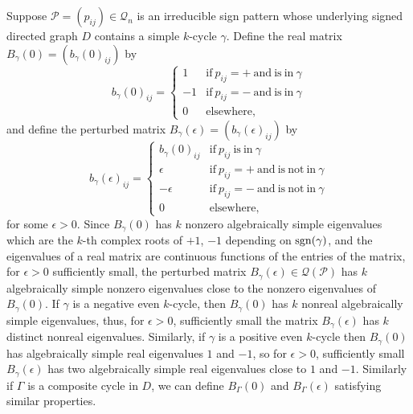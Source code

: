 \documentclass[a4paper, 10pt]{article}
\numberwithin{equation}{section}
\def\sgn{{\rm sgn}}
\begin{document}
	Suppose $\mathcal{P}=(p_{ij})\in \mathcal{Q}_n$ is an irreducible sign pattern whose underlying signed directed graph $D$ contains a simple $k$-cycle $\gamma$.  Define the real matrix $B_\gamma(0)=(b_\gamma(0)_{ij})$ by
	\begin{equation} \label{e1}
		b_{\gamma}(0)_{ij}= \begin{cases}
			1 & \text{if}\ p_{ij}=+ ~\text{and}~ \text{is}~ \text{in}~ \gamma \\
			-1 & \text{if}\ p_{ij}=- ~\text{and}~ \text{is}~ \text{in}~ \gamma \\
			0 & \text{elsewhere,}
		\end{cases}
	\end{equation}
	and define the perturbed matrix $B_\gamma(\epsilon)=(b_\gamma(\epsilon)_{ij})$ by
	\begin{equation} \label{e2}
		b_{\gamma}(\epsilon)_{ij}= \begin{cases}
			b_\gamma(0)_{ij} & \text{if}\ p_{ij}~ \text{is}~ \text{in}~ \gamma \\
			\epsilon & \text{if}\ p_{ij}=+ ~\text{and}~ \text{is}~\text{not}~ \text{in}~ \gamma \\
			-\epsilon & \text{if}\ p_{ij}=- ~\text{and}~ \text{is}~ \text{not}~\text{in}~ \gamma \\
			0 & \text{elsewhere,}
		\end{cases}
	\end{equation}
	for some $\epsilon>0$. Since $B_\gamma(0)$ has $k$ nonzero algebraically simple eigenvalues which are the $k$-th complex roots of $+1$, $-1$ depending on $\sgn(\gamma)$, and the eigenvalues of a real matrix are continuous functions of the entries of the matrix, for $\epsilon>0$ sufficiently small, the perturbed matrix $B_\gamma(\epsilon)\in \mathcal{Q}(\mathcal{P})$ has $k$ algebraically simple nonzero eigenvalues close to the nonzero eigenvalues of $B_\gamma(0)$. If $\gamma$ is a negative even $k$-cycle, then $B_\gamma(0)$ has $k$ nonreal algebraically simple eigenvalues, thus, for $\epsilon>0$, sufficiently small the matrix $B_\gamma(\epsilon)$ has $k$ distinct nonreal eigenvalues. Similarly, if $\gamma$ is a positive even $k$-cycle then $B_\gamma(0)$ has algebraically simple real eigenvalues $1$ and $-1$, so for $\epsilon>0$, sufficiently small $B_\gamma(\epsilon)$ has two algebraically simple real eigenvalues close to $1$ and $-1$.
	Similarly if $\Gamma$ is a composite cycle in $D$, we can define $B_\Gamma(0)$ and $B_{\Gamma}(\epsilon)$ satisfying similar properties. 
	
\end{document}
